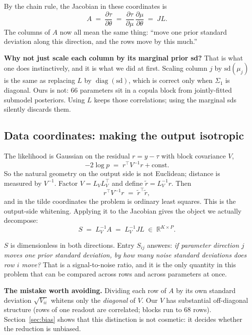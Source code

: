 \documentclass[11pt]{article}
\newcommand{\R}{\mathbb{R}}
\newcommand{\muraw}{\theta}
\newcommand{\Sig}{\Sigma_1}
\begin{document}
By the chain rule, the Jacobian in these coordinates is
\begin{equation}
  A \;=\; \frac{\partial \tau}{\partial \muraw}
    \;=\; \frac{\partial \tau}{\partial \mu}\,
          \frac{\partial \mu}{\partial \muraw}
    \;=\; J L .
  \label{eq:A}
\end{equation}
The columns of $A$ now all mean the same thing: ``move one prior standard
deviation along this direction, and the rows move by this much.''

\medskip
\noindent\textbf{Why not just scale each column by its marginal prior sd?}
That is what one does instinctively, and it is what we did at first. Scaling
column $j$ by $\mathrm{sd}(\mu_j)$ is the same as replacing $L$ by
$\operatorname{diag}(\mathrm{sd})$, which is correct only when $\Sig$ is
diagonal. Ours is not: 66 parameters sit in a copula block from jointly-fitted
submodel posteriors. Using $L$ keeps those correlations; using the marginal sds
silently discards them.

\subsection{Data coordinates: making the output isotropic}

The likelihood is Gaussian on the residual $r = y - \tau$ with block covariance
$V$,
\[
  -2\log p \;=\; r^{\top} V^{-1} r + \text{const}.
\]
So the natural geometry on the output side is not Euclidean; distance is
measured by $V^{-1}$. Factor $V = L_V L_V^{\top}$ and define $\tilde r = L_V^{-1} r$.
Then
\[
  r^{\top} V^{-1} r \;=\; \tilde r^{\top} \tilde r,
\]
and in the tilde coordinates the problem is ordinary least squares. This is the
output-side whitening. Applying it to the Jacobian gives the object we actually
decompose:
\begin{equation}
  \boxed{\;S \;=\; L_V^{-1} A \;=\; L_V^{-1} J L \;\in\; \R^{K\times P}.\;}
  \label{eq:S}
\end{equation}

$S$ is dimensionless in both directions. Entry $S_{ij}$ answers: \emph{if
parameter direction $j$ moves one prior standard deviation, by how many noise
standard deviations does row $i$ move?} That is a signal-to-noise ratio, and it
is the only quantity in this problem that can be compared across rows and across
parameters at once.

\medskip
\noindent\textbf{The mistake worth avoiding.} Dividing each row of $A$ by its own
standard deviation $\sqrt{V_{ii}}$ whitens only the \emph{diagonal} of $V$. Our
$V$ has substantial off-diagonal structure (rows of one readout are correlated;
blocks run to 68 rows). Section~\ref{sec:bias} shows that this distinction is
not cosmetic: it decides whether the reduction is unbiased.
\end{document}
